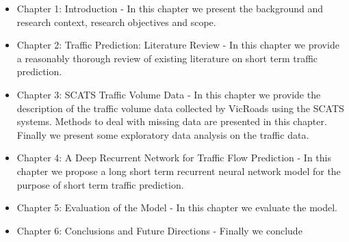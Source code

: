 \begin{itemize}
\item Chapter 1: Introduction - In this chapter we present the background and research context,
research objectives and scope.

\item Chapter 2: Traffic Prediction: Literature Review - In this chapter we provide a reasonably
thorough review of existing literature on short term traffic prediction.

\item Chapter 3: SCATS Traffic Volume Data - In this chapter we provide the description of the
traffic volume data collected by VicRoads using the SCATS systems. Methods to deal with missing
data are presented in this chapter. Finally we present some exploratory data analysis on the
traffic data.

\item Chapter 4: A Deep Recurrent Network for Traffic Flow Prediction - In this chapter we propose
a long short term recurrent neural network model for the purpose of short term traffic prediction.

\item Chapter 5: Evaluation of the Model - In this chapter we evaluate the model.

\item Chapter 6: Conclusions and Future Directions - Finally we conclude
\end{itemize}
